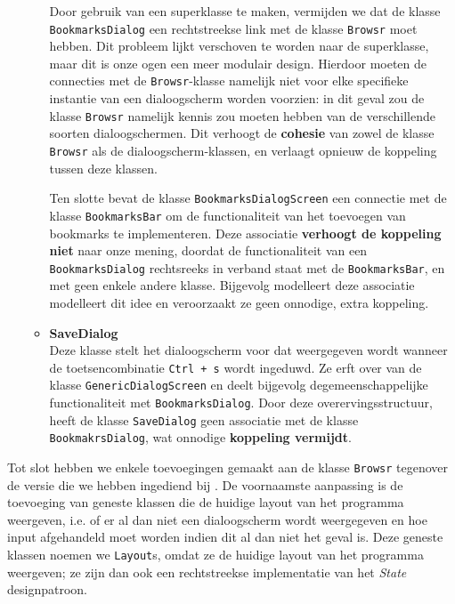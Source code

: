 \documentclass[12pt]{article}
\begin{document}
\begin{itemize}
\begin{itemize}
		Door gebruik van een superklasse te maken, vermijden we dat de klasse \texttt{BookmarksDialog} een rechtstreekse link met de klasse \texttt{Browsr} moet hebben. Dit probleem lijkt verschoven te worden naar de superklasse, maar dit is onze ogen een meer modulair design. Hierdoor moeten de connecties met de \texttt{Browsr}-klasse namelijk niet voor elke specifieke instantie van een dialoogscherm worden voorzien: in dit geval zou de klasse \texttt{Browsr} namelijk kennis zou moeten hebben van de verschillende soorten dialoogschermen. Dit verhoogt de \textbf{cohesie} van zowel de klasse \texttt{Browsr} als de dialoogscherm-klassen, en verlaagt opnieuw de koppeling tussen deze klassen.
		
		Ten slotte bevat de klasse \texttt{BookmarksDialogScreen} een connectie met de klasse \texttt{BookmarksBar} om de functionaliteit van het toevoegen van bookmarks te implementeren. Deze associatie \textbf{verhoogt de koppeling niet} naar onze mening, doordat de functionaliteit van een \texttt{BookmarksDialog} rechtsreeks in verband staat met de \texttt{BookmarksBar}, en met geen enkele andere klasse. Bijgevolg modelleert deze associatie modelleert dit idee en veroorzaakt ze geen onnodige, extra koppeling.
		
		\item \textbf{SaveDialog}\\
		Deze klasse stelt het dialoogscherm voor dat weergegeven wordt wanneer de toetsencombinatie \texttt{Ctrl + s} wordt ingeduwd. Ze erft over van de klasse \texttt{GenericDialogScreen} en deelt bijgevolg degemeenschappelijke functionaliteit met \texttt{BookmarksDialog}. Door deze overervingsstructuur, heeft de klasse \texttt{SaveDialog} geen associatie met de klasse \texttt{BookmakrsDialog}, wat onnodige \textbf{koppeling vermijdt}.
	\end{itemize}	
\end{itemize}

Tot slot hebben we enkele toevoegingen gemaakt aan de klasse \texttt{Browsr} tegenover de versie die we hebben ingediend bij . De voornaamste aanpassing is de toevoeging van geneste klassen die de huidige layout van het programma weergeven, i.e. of er al dan niet een dialoogscherm wordt weergegeven en hoe input afgehandeld moet worden indien dit al dan niet het geval is. Deze geneste klassen noemen we \texttt{Layout}s, omdat ze de huidige layout van het programma weergeven; ze zijn dan ook een rechtstreekse implementatie van het \textit{State} designpatroon. 
\end{document}
